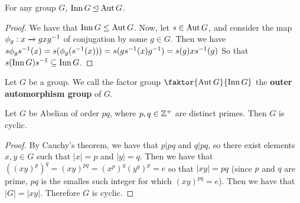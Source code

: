 \begin{proposition}\label{proposition_4.4.7}
  For any group $G$,  $\operatorname{Inn}{G} \unlhd \operatorname{Aut}{G}$.
\end{proposition}
\begin{proof}
  We have that $\operatorname{Inn}{G} \leq \operatorname{Aut}{G}$. Now, let $s \in \operatorname{Aut}{G}$, and consider
  the map $\phi_g:x \xrightarrow{} gxg^{-1}$ of conjugation by some $g \in G$.
  Then we have $s\phi_gs^{-1}(x)=s(\phi_g(s^{-1}(x)))=s(gs^{-1}(x)g^{-1})=
  s(g)xs^{-1}(g)$ So that $s(\operatorname{Inn}{G})s^{-1} \subseteq \operatorname{Inn}{G}$.
\end{proof}

\begin{definition}
  Let $G$ be a group. We call the factor group  $\faktor{\Aut{G}}{\Inn{G}}$
  the \textbf{outer automorphism group} of $G$.
\end{definition}

\begin{proposition}\label{proposition_4.4.8}
  Let $G$ be Abelian of order $pq$, where $p,q \in \mathbb{Z}^+$ are distinct primes.
  Then $G$ is cyclic.
\end{proposition}
\begin{proof}
  By Cauchy's theorem, we have that $p|pq$ and  $q|pq$, so there exist
  elements  $x,y \in G$ such that  $|x|=p$ and $|y|=q$. Then we have
  that $((xy)^p)^q=(xy)^{pq}=(x^p)^q(y^q)^p=e$ so that $|xy|=pq$ (since
  $p$ and $q$ are prime, $pq$ is the smalles such integer for which
  $(xy)^{pq}=e$). Then we have that $|G|=|xy|$. Therefore $G$ is
  cyclic.
\end{proof}
